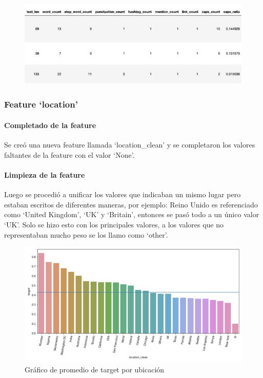 \documentclass[12pt]{article}
\begin{document}
\begin{figure}[H]
    \centering
    \includegraphics[scale = 0.9]{imgs/table_2.jpg}
    \label{tp:fig:location}
\end{figure}


\subsubsection{Feature ‘location’}
\paragraph{Completado de la feature\\}
\newline Se creó una nueva feature llamada ‘location\_clean’ y se completaron los valores faltantes de la feature con el valor ‘None’.


\paragraph{Limpieza de la feature\\}
Luego se procedió a unificar los valores que indicaban un mismo lugar pero estaban escritos de diferentes maneras, por ejemplo: Reino Unido es referenciado como ‘United Kingdom’, ‘UK’ y ‘Britain’, entonces se pasó todo a un único valor ‘UK’.
Solo se hizo esto con los principales valores, a los valores que no representaban mucho peso se los llamo como ‘other’.

\begin{figure}[H]
    \centering
    \includegraphics[scale = 0.7]{imgs/graph_1.jpg}
    \caption{Gráfico de promedio de target por ubicación}
    \label{tp:fig:equilibrium}
\end{figure}
\end{document}
